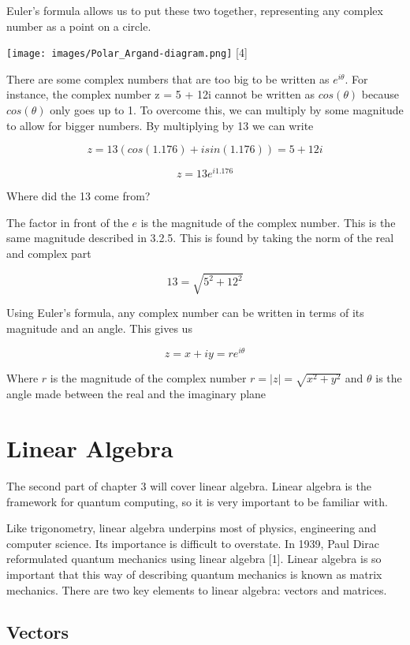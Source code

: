 \documentclass{book}
\begin{document}
Euler's formula allows us to put these two together, representing any complex number as a point on a circle. 

\texttt{[image: images/Polar\_Argand-diagram.png]}
[4]

There are some complex numbers that are too big to be written as $e^{i\theta}$. For instance, the complex number z = 5 + 12i cannot be written as $cos(\theta)$ because $cos(\theta)$ only goes up to 1. To overcome this, we can multiply by some magnitude to allow for bigger numbers. By multiplying by 13 we can write 

$$ z = 13(cos(1.176) + i sin(1.176) )= 5 + 12i $$

$$ z = 13e^{i 1.176}$$

Where did the 13 come from? 

The factor in front of the $e$ is the magnitude of the complex number. This is the same magnitude described in 3.2.5. This is found by taking the norm of the real and complex part 

$$ 13 = \sqrt{ 5^2 + 12^2} $$


Using Euler's formula, any complex number can be written in terms of its magnitude and an angle. This gives us 

$$z = x + iy = re^{i\theta}$$ 

Where $r$ is the magnitude of the complex number $r = |z| = \sqrt{x^2 + y^2}$ and $\theta$ is the angle made between the real and the imaginary plane



\section{Linear Algebra}

The second part of chapter 3 will cover linear algebra. Linear algebra is the framework for quantum computing, so it is very important to be familiar with. 

Like trigonometry, linear algebra underpins most of physics, engineering and computer science. Its importance is difficult to overstate. In 1939, Paul Dirac reformulated quantum mechanics using linear algebra [1]. Linear algebra is so important that this way of describing quantum mechanics is known as matrix mechanics. There are two key elements to linear algebra: vectors and matrices. 

\subsection{ Vectors}
\end{document}
